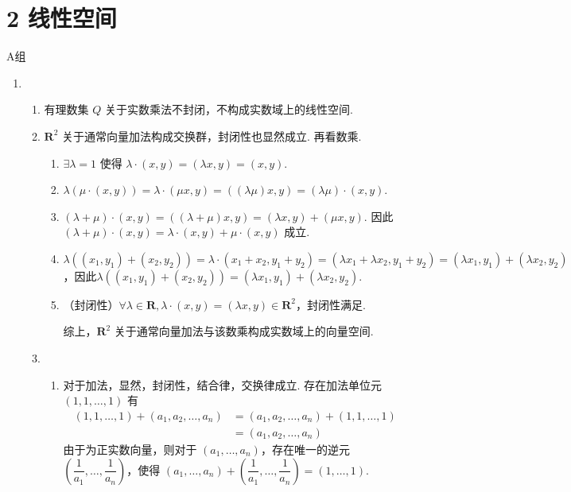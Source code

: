 \section*{2 线性空间}

\vspace{2ex}

\centerline{\heiti A组}
\begin{enumerate}
    \item \begin{enumerate}
              \item 有理数集 $Q$ 关于实数乘法不封闭，不构成实数域上的线性空间.

              \item $\mathbf{R}^2$ 关于通常向量加法构成交换群，封闭性也显然成立. 再看数乘.
                    \begin{enumerate}
                        \item $\exists \lambda=1$ 使得 $\lambda\cdot(x,y)=(\lambda x,y)=(x,y)$.

                        \item $\lambda(\mu\cdot(x,y))=\lambda\cdot(\mu x,y)=((\lambda\mu)x,y)=(\lambda\mu)\cdot(x,y)$.

                        \item $(\lambda+\mu)\cdot(x,y)=((\lambda+\mu)x,y)=(\lambda x,y)+(\mu x,y)$. 因此$(\lambda+\mu)\cdot(x,y)=\lambda\cdot(x,y)+\mu\cdot(x,y)$ 成立.

                        \item $\lambda((x_1,y_1)+(x_2,y_2))=\lambda\cdot(x_1+x_2,y_1+y_2)=(\lambda x_1+\lambda x_2,y_1+y_2)=(\lambda x_1,y_1)+(\lambda x_2,y_2)$，因此$\lambda((x_1,y_1)+(x_2,y_2))=(\lambda x_1,y_1)+(\lambda x_2,y_2)$.

                        \item （封闭性）$\forall \lambda \in \mathbf{R},\lambda\cdot(x,y)=(\lambda x,y)\in \mathbf{R}^2$，封闭性满足.

                              综上，$\mathbf{R}^2$ 关于通常向量加法与该数乘构成实数域上的向量空间.
                    \end{enumerate}

              \item \begin{enumerate}
                        \item 对于加法，显然，封闭性，结合律，交换律成立. 存在加法单位元 $(1,1,\ldots,1)$ 有
                              \begin{align*}
                                  (1,1,\ldots,1)+(a_1,a_2,\ldots,a_n) & = (a_1,a_2,\ldots,a_n)+(1,1,\ldots,1) \\
                                                                      & = (a_1,a_2,\ldots,a_n)
                              \end{align*}
                              由于为正实数向量，则对于 $(a_1,\ldots,a_n)$，存在唯一的逆元 $\left(\dfrac 1{a_1},\ldots,\dfrac 1{a_n}\right)$，使得 $(a_1,\ldots,a_n)+\left(\dfrac 1{a_1},\ldots,\dfrac 1{a_n}\right)=(1,\ldots,1)$.


\end{enumerate}
\end{enumerate}
\end{enumerate}
